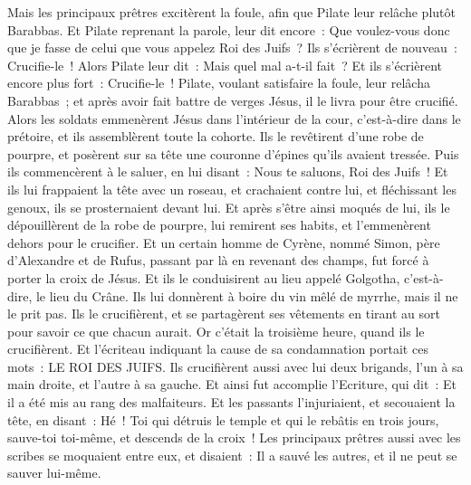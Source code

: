 \begin{multicols}{2}
Mais les principaux prêtres excitèrent la foule, afin que Pilate leur relâche plutôt Barabbas.
Et Pilate reprenant la parole, leur dit encore~: Que voulez-vous donc que je fasse de celui que vous appelez Roi des Juifs~?
Ils s'écrièrent de nouveau~: Crucifie-le~!
Alors Pilate leur dit~: Mais quel mal a-t-il fait~? Et ils s'écrièrent encore plus fort~: Crucifie-le~!
Pilate, voulant satisfaire la foule, leur relâcha Barabbas~; et après avoir fait battre de verges Jésus, il le livra pour être crucifié.
Alors les soldats emmenèrent Jésus dans l'intérieur de la cour, c'est-à-dire dans le prétoire, et ils assemblèrent toute la cohorte.
Ils le revêtirent d'une robe de pourpre, et posèrent sur sa tête une couronne d'épines qu'ils avaient tressée.
Puis ils commencèrent à le saluer, en lui disant~: Nous te saluons, Roi des Juifs~!
Et ils lui frappaient la tête avec un roseau, et crachaient contre lui, et fléchissant les genoux, ils se prosternaient devant lui.
Et après s'être ainsi moqués de lui, ils le dépouillèrent de la robe de pourpre, lui remirent ses habits, et l'emmenèrent dehors pour le crucifier.
Et un certain homme de Cyrène, nommé Simon, père d'Alexandre et de Rufus, passant par là en revenant des champs, fut forcé à porter la croix de Jésus.
Et ils le conduisirent au lieu appelé Golgotha, c'est-à-dire, le lieu du Crâne.
Ils lui donnèrent à boire du vin mêlé de myrrhe, mais il ne le prit pas.
Ils le crucifièrent, et se partagèrent ses vêtements en tirant au sort pour savoir ce que chacun aurait.
Or c'était la troisième heure, quand ils le crucifièrent.
Et l'écriteau indiquant la cause de sa condamnation portait ces mots~: LE ROI DES JUIFS.
Ils crucifièrent aussi avec lui deux brigands, l'un à sa main droite, et l'autre à sa gauche.
Et ainsi fut accomplie l'Ecriture, qui dit~: Et il a été mis au rang des malfaiteurs.
Et les passants l'injuriaient, et secouaient la tête, en disant~: Hé~! Toi qui détruis le temple et qui le rebâtis en trois jours,
sauve-toi toi-même, et descends de la croix~!
Les principaux prêtres aussi avec les scribes se moquaient entre eux, et disaient~: Il a sauvé les autres, et il ne peut se sauver lui-même.

\end{multicols}

